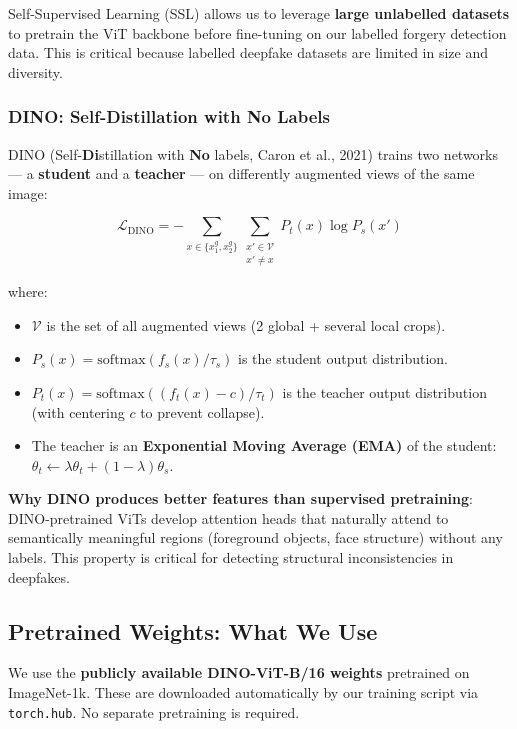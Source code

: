 \documentclass[12pt,a4paper]{article}
\begin{document}
Self-Supervised Learning (SSL) allows us to leverage \textbf{large unlabelled datasets}
to pretrain the ViT backbone before fine-tuning on our labelled forgery detection data.
This is critical because labelled deepfake datasets are limited in size and diversity.

\subsubsection{DINO: Self-Distillation with No Labels}

DINO (Self-\textbf{Di}stillation with \textbf{No} labels, Caron et al., 2021) trains two
networks --- a \textbf{student} and a \textbf{teacher} --- on differently augmented views
of the same image:

\begin{equation}
  \mathcal{L}_{\text{DINO}} =
  -\sum_{x \in \{x_1^g, x_2^g\}} \sum_{\substack{x' \in \mathcal{V} \\ x' \neq x}}
  P_t(x) \log P_s(x')
\end{equation}

where:
\begin{itemize}[leftmargin=1.5em]
  \item $\mathcal{V}$ is the set of all augmented views (2 global + several local crops).
  \item $P_s(x) = \text{softmax}(f_s(x) / \tau_s)$ is the student output distribution.
  \item $P_t(x) = \text{softmax}((f_t(x) - c) / \tau_t)$ is the teacher output distribution
    (with centering $c$ to prevent collapse).
  \item The teacher is an \textbf{Exponential Moving Average (EMA)} of the student:
    $\theta_t \leftarrow \lambda \theta_t + (1 - \lambda) \theta_s$.
\end{itemize}

\textbf{Why DINO produces better features than supervised pretraining}: DINO-pretrained
ViTs develop attention heads that naturally attend to semantically meaningful regions
(foreground objects, face structure) without any labels. This property is critical for
detecting structural inconsistencies in deepfakes.

\subsection{Pretrained Weights: What We Use}

We use the \textbf{publicly available DINO-ViT-B/16 weights} pretrained on ImageNet-1k.
These are downloaded automatically by our training script via \texttt{torch.hub}. No
separate pretraining is required.
\end{document}
